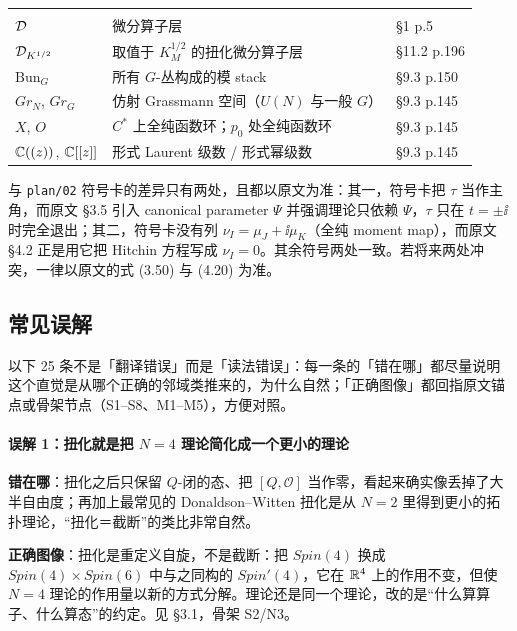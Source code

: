 \begin{longtable}{@{}>{\raggedright\arraybackslash}p{3.15cm}>{\raggedright\arraybackslash}p{9.05cm}>{\raggedright\arraybackslash}p{3.1cm}@{}}
\addlinespace[3pt]
\multicolumn{3}{@{}l}{\tabhead{层与模空间}}\\
\addlinespace[1pt]
$\mathcal{D}$ & 微分算子层 & \S1 p.5 \\
\addlinespace[1pt]
$\mathcal{D}_{K^{1/2}}$ & 取值于 $K_M^{1/2}$ 的扭化微分算子层 & \S11.2 p.196 \\
\addlinespace[1pt]
$\mathrm{Bun}_G$ & 所有 $G$-丛构成的模 stack & \S9.3 p.150 \\
\addlinespace[1pt]
$Gr_N$, $Gr_G$ & 仿射 Grassmann 空间（$U(N)$ 与一般 $G$） & \S9.3 p.145 \\
\addlinespace[1pt]
$X$, $O$ & $C^*$ 上全纯函数环；$p_0$ 处全纯函数环 & \S9.3 p.145 \\
\addlinespace[1pt]
$\mathbb{C}((z))$, $\mathbb{C}[[z]]$ & 形式 Laurent 级数 / 形式幂级数 & \S9.3 p.145 \\

\end{longtable}
\endgroup

\noindent 与 \texttt{plan/02} 符号卡的差异只有两处，且都以原文为准：其一，符号卡把 $\tau$ 当作主角，而原文 \S3.5 引入 canonical parameter $\Psi$ 并强调理论只依赖 $\Psi$，$\tau$ 只在 $t=\pm\ii$ 时完全退出；其二，符号卡没有列 $\nu_I=\mu_J+\ii\mu_K$（全纯 moment map），而原文 \S4.2 正是用它把 Hitchin 方程写成 $\nu_I=0$。其余符号两处一致。若将来两处冲突，一律以原文的式 (3.50) 与 (4.20) 为准。

\subsection{常见误解}\label{sec:terms-misconceptions}

以下 25 条不是「翻译错误」而是「读法错误」：每一条的「错在哪」都尽量说明这个直觉是从哪个正确的邻域类推来的，为什么自然；「正确图像」都回指原文锚点或骨架节点（S1--S8、M1--M5），方便对照。

\paragraph{误解 1：扭化就是把 $N=4$ 理论简化成一个更小的理论}
\mbox{}\par\noindent
\textbf{错在哪}：扭化之后只保留 $Q$-闭的态、把 $[Q,\mathcal{O}]$ 当作零，看起来确实像丢掉了大半自由度；再加上最常见的 Donaldson--Witten 扭化是从 $N=2$ 里得到更小的拓扑理论，“扭化＝截断”的类比非常自然。
\par\noindent
\textbf{正确图像}：扭化是重定义自旋，不是截断：把 $Spin(4)$ 换成 $Spin(4)\times Spin(6)$ 中与之同构的 $Spin'(4)$，它在 $\mathbb{R}^4$ 上的作用不变，但使 $N=4$ 理论的作用量以新的方式分解。理论还是同一个理论，改的是“什么算算子、什么算态”的约定。见 \S3.1，骨架 S2/N3。

